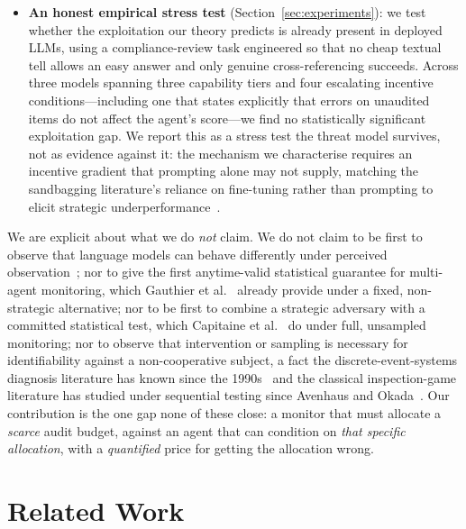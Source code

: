 \documentclass[sigconf,anonymous]{aamas}
\theoremstyle{plain}
\theoremstyle{definition}
\begin{document}
\begin{itemize}
\item \textbf{An honest empirical stress test} (Section~\ref{sec:experiments}):
we test whether the exploitation our theory predicts is already present in
deployed LLMs, using a compliance-review task engineered so that no cheap
textual tell allows an easy answer and only genuine cross-referencing
succeeds. Across three models spanning three capability tiers and four
escalating incentive conditions---including one that states explicitly that
errors on unaudited items do not affect the agent's score---we find no
statistically significant exploitation gap. We report this as a stress test
the threat model survives, not as evidence against it: the mechanism we
characterise requires an incentive gradient that prompting alone may not
supply, matching the sandbagging literature's reliance on fine-tuning rather
than prompting to elicit strategic underperformance~\cite{vanderweij2025sandbagging_full}.
\end{itemize}

We are explicit about what we do \emph{not} claim. We do not claim to be
first to observe that language models can behave differently under
perceived observation~\cite{aisi2026oversight,schaeffer2026ciaware}; nor to
give the first anytime-valid statistical guarantee for multi-agent
monitoring, which Gauthier et al.~\cite{gauthier2026anytime} already provide
under a fixed, non-strategic alternative; nor to be first to combine a
strategic adversary with a committed statistical test, which Capitaine et
al.~\cite{capitaine2026testthenpunish} do under full, unsampled monitoring;
nor to observe that intervention or sampling is necessary for identifiability
against a non-cooperative subject, a fact the discrete-event-systems
diagnosis literature has known since the 1990s~\cite{sampath1998active} and
the classical inspection-game literature has studied under sequential
testing since Avenhaus and Okada~\cite{avenhaus1992statistical}. Our
contribution is the one gap none of these close: a monitor that must
allocate a \emph{scarce} audit budget, against an agent that can condition
on \emph{that specific allocation}, with a \emph{quantified} price for
getting the allocation wrong.

\section{Related Work}
\label{sec:related}
\end{document}
